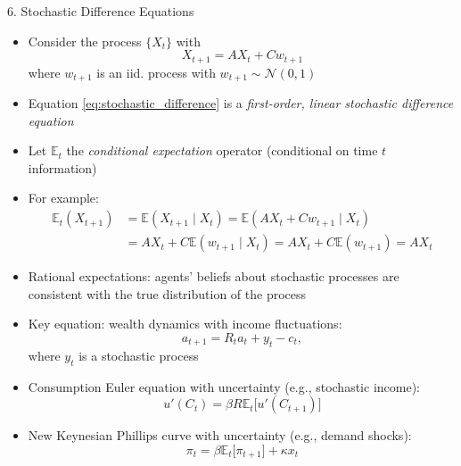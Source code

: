 \documentclass[10pt]{beamer}
\begin{document}
\begin{frame}{6. Stochastic Difference Equations}
\begin{itemize}
\item Consider the process $\{X_t\}$ with 
\begin{equation}\label{eq:stochastic_difference}
	X_{t+1} = A X_t + Cw_{t+1}
\end{equation}
where $w_{t+1}$ is an iid. process with $w_{t+1} \sim \mathcal N(0, 1)$

\item Equation \eqref{eq:stochastic_difference} is a \textit{first-order, linear stochastic difference equation}

\item Let $\mathbb E_t$ the \textit{conditional expectation} operator (conditional on time $t$ information)

\item For example:
\begin{align*}
	\mathbb E_t(X_{t+1}) &= \mathbb E(X_{t+1} \mid X_t) = \mathbb E(A X_t + Cw_{t+1} \mid X_t) \\
	&= A X_t + C \mathbb E(w_{t+1} \mid X_t) = A X_t + C \mathbb E(w_{t+1}) = A X_t
\end{align*}
\end{itemize}
\end{frame}


\begin{frame}{}
\begin{itemize}
\item Rational expectations: agents' beliefs about stochastic processes are consistent with the true distribution of the process

\item Key equation: wealth dynamics with income fluctuations:
\begin{equation*}
	a_{t+1} = R_t a_t + y_t - c_t,
\end{equation*}
where $y_t$ is a stochastic process

\item Consumption Euler equation with uncertainty (e.g., stochastic income):
\begin{equation*}
	u'(C_t) = \beta R \mathbb E_t \Big[ u'(C_{t+1}) \Big]
\end{equation*}

\item New Keynesian Phillips curve with uncertainty (e.g., demand shocks):
\begin{equation*}
	\pi_t = \beta \mathbb E_t \Big[ \pi_{t+1} \Big] + \kappa x_t
\end{equation*}
\end{itemize}
\end{frame}











\appendix
\end{document}
